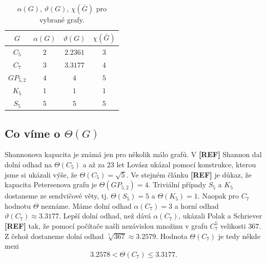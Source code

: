 \begin{table}[h!]
    \centering
    \begin{tabular}{ c | c c c }
        $G$        & $\alpha(G)$ & $\vartheta(G)$ & $\chi(\bar{G})$ \\
        \hline
        $C_5$      & $2$         & $2.2361$       & $3$ \\  
        $C_7$      & $3$         & $3.3177$       & $4$ \\
        $GP_{5,2}$ & $4$         & $4$            & $5$ \\
        $K_5$      & $1$         & $1$            & $1$ \\
        $S_5$      & $5$         & $5$            & $5$
    \end{tabular}
    \caption{$\alpha(G)$, $\vartheta(G)$, $\chi(\bar{G})$ pro vybrané grafy.}
    \label{tab:sandwitch}
\end{table}

\subsection*{Co víme o $\Theta(G)$}

Shannonova kapacita je známá jen pro několik málo grafů. V \textbf{[REF]} Shannon dal dolní odhad na $\Theta(C_5)$ a až za 23 let Lovász ukázal pomocí konstrukce, kterou jsme si ukázali výše, že $\Theta(C_5) = \sqrt{5}$. Ve stejném článku \textbf{[REF]} je důkaz, že kapacita Petersenova grafu je $\Theta(GP_{5,2}) = 4$. Triviální případy $S_5$ a $K_5$ dostaneme ze sendvičové věty, tj. $\Theta(S_5) = 5$ a $\Theta(K_5) = 1$. Naopak pro $C_7$ hodnotu $\Theta$ neznáme. Máme dolní odhad $\alpha(C_7) = 3$ a horní odhad $\vartheta(C_7) \approx 3.3177$. Lepší dolní odhad, než dává $\alpha(C_7)$, ukázali Polak a Schriever \textbf{[REF]} tak, že pomocí počítače našli nezávislou množinu v grafu $C_7^5$ velikosti $367$. Z čehož dostaneme dolní odhad $\sqrt[5]{367} \approx 3.2579$. Hodnota $\Theta(C_7)$ je tedy někde mezi
$$
    3.2578 < \Theta(C_7) \leq 3.3177.
$$

